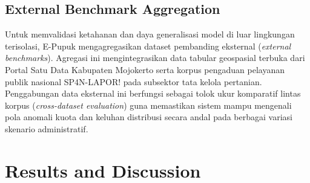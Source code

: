 ﻿\documentclass[conference]{IEEEtran}
\begin{document}
\begin{table}[htbp]
\caption{Detail Distribusi dan Partisi Dataset Terverifikasi E-Pupuk}
\begin{center}
\label{tab:dataset_distribution}
\end{center}
\end{table}

\subsection{External Benchmark Aggregation}
Untuk memvalidasi ketahanan dan daya generalisasi model di luar lingkungan terisolasi, E-Pupuk mengagregasikan dataset pembanding eksternal (\textit{external benchmarks}). Agregasi ini mengintegrasikan data tabular geospasial terbuka dari Portal Satu Data Kabupaten Mojokerto serta korpus pengaduan pelayanan publik nasional SP4N-LAPOR! pada subsektor tata kelola pertanian. Penggabungan data eksternal ini berfungsi sebagai tolok ukur komparatif lintas korpus (\textit{cross-dataset evaluation}) guna memastikan sistem mampu mengenali pola anomali kuota dan keluhan distribusi secara andal pada berbagai variasi skenario administratif.

\section{Results and Discussion}
\label{sec:results_and_discussion}
\end{document}
